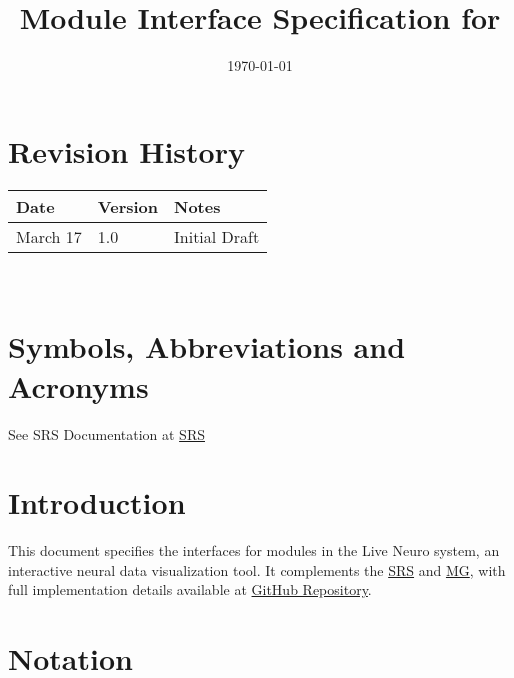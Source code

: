 \documentclass[12pt, titlepage]{article}
\begin{document}
\title{Module Interface Specification for \progname{}}

\author{\authname}

\date{\today}

\maketitle


\section{Revision History}

\begin{tabularx}{\textwidth}{p{3cm}p{2cm}X}
\toprule {\bf Date} & {\bf Version} & {\bf Notes}\\
\midrule
March 17 & 1.0 & Initial Draft\\
\bottomrule
\end{tabularx}

~\newpage

\section{Symbols, Abbreviations and Acronyms}

See SRS Documentation at \href{https://github.com/liang-bo96/CAS741/blob/main/docs/SRS/SRS.pdf}{SRS}


\newpage

\tableofcontents

\newpage


\section{Introduction}

This document specifies the interfaces for modules in the Live Neuro system, an interactive neural data visualization tool. It complements the
\href{https://github.com/liang-bo96/CAS741/blob/main/docs/SRS/SRS.pdf}{SRS}
and \href{https://github.com/liang-bo96/CAS741/blob/main/docs/Design/SoftArchitecture/MG.pdf}{MG}, with full implementation details available at
\href{https://github.com/liang-bo96/CAS741}{ GitHub Repository}.

\section{Notation}
\end{document}
